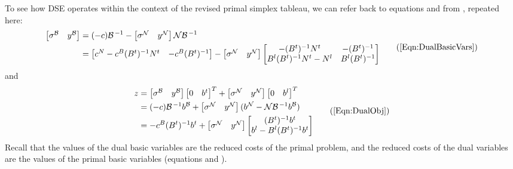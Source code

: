 To see how DSE operates within the context of the revised primal simplex
tableau, we can refer back to equations  and
 from , repeated here:
\begin{equation}
\begin{split}
\begin{bmatrix} \sigma^\mathcal{B} & y^\mathcal{B} \end{bmatrix} & =
    (-c)\mathcal{B}^{\,-1} -
    \begin{bmatrix} \sigma^\mathcal{N} & y^\mathcal{N} \end{bmatrix}
    \mathcal{N}\mathcal{B}^{\,-1} \\
& = \begin{bmatrix} c^N - c^B (B^t)^{-1} N^t & -c^B (B^t)^{-1} \end{bmatrix} -
    \begin{bmatrix} \sigma^\mathcal{N} & y^\mathcal{N} \end{bmatrix}
    \begin{bmatrix}
      -(B^t)^{-1} N^t & -(B^t)^{-1} \\
      B^l(B^t)^{-1} N^t - N^l & B^l(B^t)^{-1}
    \end{bmatrix}
\end{split} \tag{\ref{Eqn:DualBasicVars}}
\end{equation}
and
\begin{equation}
\begin{split}
z & = \begin{bmatrix} \sigma^\mathcal{B} & y^\mathcal{B} \end{bmatrix}
      \begin{bmatrix} 0 & b^t \end{bmatrix}^T +
      \begin{bmatrix} \sigma^\mathcal{N} & y^\mathcal{N} \end{bmatrix}
      \begin{bmatrix} 0 & b^l \end{bmatrix}^T \\
  & = (-c)\mathcal{B}^{\,-1} b^\mathcal{B} +
      \begin{bmatrix} \sigma^\mathcal{N} & y^\mathcal{N} \end{bmatrix}
      (b^\mathcal{N} - \mathcal{N}\mathcal{B}^{\,-1} b^\mathcal{B}) \\
  & = -c^B (B^t)^{-1} b^t +
      \begin{bmatrix} \sigma^\mathcal{N} & y^\mathcal{N} \end{bmatrix}
      \begin{bmatrix} (B^t)^{-1} b^t \\ b^l - B^l(B^t)^{-1} b^t \end{bmatrix}
\end{split} \tag{\ref{Eqn:DualObj}}
\end{equation}
Recall that the values of the dual basic variables are the reduced costs of
the primal problem, and the reduced costs of the dual variables are the values
of the primal basic variables (\cf equations  and
).

